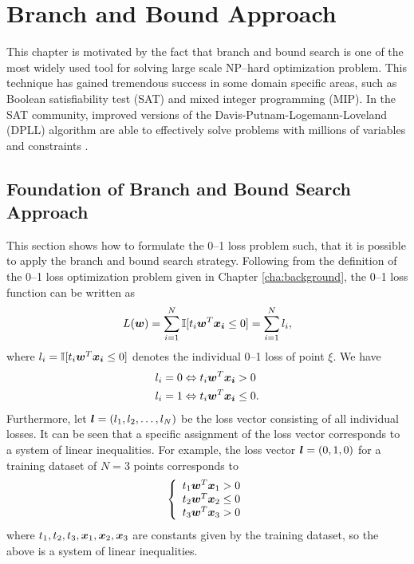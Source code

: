 \section{Branch and Bound Approach}
\label{cha:branchandbound}

This chapter is motivated by the fact that branch and bound search is
one of the most widely used tool for solving large scale NP--hard
optimization problem. This technique has gained tremendous success in
some domain specific areas, such as Boolean satisfiability test (SAT)
and mixed integer programming (MIP). In the SAT community, improved
versions of the Davis-Putnam-Logemann-Loveland (DPLL) algorithm are
able to effectively solve problems with millions of variables and
constraints \cite{harmelen}.

\subsection{Foundation of Branch and Bound Search Approach}
\label{sec:bnb.idea}

This section shows how to formulate the 0--1 loss problem such, that
it is possible to apply the branch and bound search
strategy. Following from the definition of the 0--1 loss optimization
problem given in Chapter \ref{cha:background}, the 0--1 loss function
can be written as
$$L(\boldsymbol{w}) = \sum_{i=1}^N \mathbb{I} [t_i \boldsymbol{w}^T \boldsymbol{x_i} \leq 0] = \sum_{i=1}^N l_i,$$ 
where $l_i =\mathbb{I} [t_i \boldsymbol{w}^T \boldsymbol{x_i} \leq 0]$ denotes the individual 0--1 loss of point $\xi$. We have
\[ \begin{split}
l_i = 0 &\Leftrightarrow t_i \boldsymbol{w}^T \boldsymbol{x_i} > 0 \\
l_i = 1 &\Leftrightarrow t_i \boldsymbol{w}^T \boldsymbol{x_i} \leq 0. \\
\end{split} \] 
Furthermore, let $\boldsymbol{l}=(l_1, l_2, \dots, l_N)$ be the loss vector
consisting of all individual losses. It can be seen that a specific
assignment of the loss vector corresponds to a system of linear
inequalities. For example, the loss vector $\boldsymbol{l}=(0,1,0)$ for a training
dataset of $N=3$ points corresponds to
$$
\left\{
     \begin{array}{l}
       t_1 \boldsymbol{w}^T \boldsymbol{x}_1 > 0\\
       t_2 \boldsymbol{w}^T \boldsymbol{x}_2 \leq 0\\
       t_3 \boldsymbol{w}^T \boldsymbol{x}_3 > 0
     \end{array}
\right.
$$ where $t_1, t_2, t_3, \boldsymbol{x}_1, \boldsymbol{x}_2, \boldsymbol{x}_3$ are constants given by the
training dataset, so the above is a system of linear inequalities.

